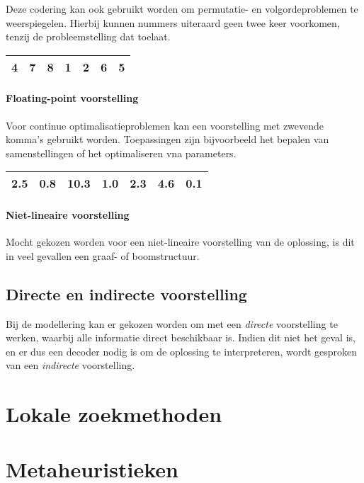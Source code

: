 Deze codering kan ook gebruikt worden om permutatie- en volgordeproblemen te weerspiegelen.
Hierbij kunnen nummers uiteraard geen twee keer voorkomen, tenzij de probleemstelling dat toelaat.
%
\begin{table}[!h]
    \centering
    \begin{tabular}{|l|l|l|l|l|l|l|}
    \hline
    4 & 7 & 8 & 1 & 2 & 6 & 5 \\ \hline
    \end{tabular}
\end{table}
%

\paragraph{Floating-point voorstelling}
Voor continue optimalisatieproblemen kan een voorstelling met zwevende komma's gebruikt worden.
Toepassingen zijn bijvoorbeeld het bepalen van samenstellingen of het optimaliseren vna parameters.

%
\begin{table}[!h]
    \centering
    \begin{tabular}{|l|l|l|l|l|l|l|}
    \hline
    2.5 & 0.8 & 10.3 & 1.0 & 2.3 & 4.6 & 0.1 \\ \hline
    \end{tabular}
\end{table}
%
\paragraph{Niet-lineaire voorstelling}
Mocht gekozen worden voor een niet-lineaire voorstelling van de oplossing, is dit in veel gevallen een graaf- of boomstructuur. 

\subsection{Directe en indirecte voorstelling}
Bij de modellering kan er gekozen worden om met een \emph{directe} voorstelling te werken, waarbij alle informatie direct beschikbaar is. Indien dit niet het geval is, en er dus een decoder nodig is om de oplossing te interpreteren, wordt gesproken van een \emph{indirecte} voorstelling.

\section{Lokale zoekmethoden}

\section{Metaheuristieken}